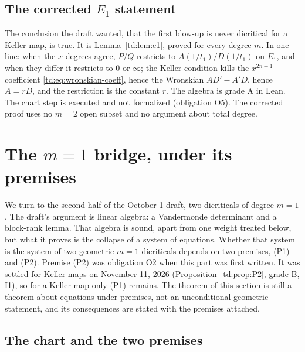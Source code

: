 \documentclass[a4paper,11pt]{article}
\theoremstyle{jsplain}
\theoremstyle{jsdef}
\theoremstyle{jsrem}
\begin{document}
\subsection{The corrected \texorpdfstring{$E_1$}{E1} statement}

The conclusion the draft wanted, that the first blow-up is never dicritical for a Keller map, is
true. It is Lemma~\ref{td:lem:e1}, proved for every degree $m$. In one line: when the $x$-degrees
agree, $P/Q$ restricts to $A(1/t_1)/D(1/t_1)$ on $E_1$, and when they differ it restricts to $0$
or $\infty$; the Keller condition kills the $x^{2n-1}$-coefficient
\eqref{td:eq:wronskian-coeff}, hence the Wronskian $AD' - A'D$, hence $A = rD$, and the
restriction is the constant $r$. The algebra is grade A in Lean. The chart step is executed and not
formalized (obligation O5). The corrected proof uses no $m = 2$ open subset and no argument about
total degree.

\section{The \texorpdfstring{$m=1$}{m=1} bridge, under its premises}\label{td:sec:bridge}

We turn to the second half of the October 1 draft, two dicriticals of degree $m = 1$. The
draft's argument is linear algebra: a Vandermonde determinant and a block-rank lemma. That
algebra is sound, apart from one weight treated below, but what it proves is the collapse of a
system of equations. Whether that system is the system of two geometric $m = 1$ dicriticals
depends on two premises, (P1) and (P2). Premise (P2) was obligation O2 when this part was
first written. It was settled for Keller maps on November 11, 2026
(Proposition~\ref{td:prop:P2}, grade B, I1), so for a Keller map only (P1) remains. The theorem
of this section is still a theorem about equations under premises, not an unconditional geometric statement, and its consequences are stated with the
premises attached.

\subsection{The chart and the two premises}
\end{document}
